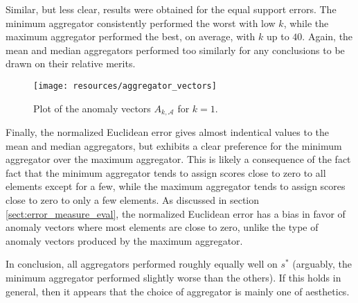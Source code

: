 Similar, but less clear, results were obtained for the equal support errors. The minimum aggregator consistently performed the worst with low $k$, while the maximum aggregator performed the best, on average, with $k$ up to $40$. Again, the mean and median aggregators performed too similarly for any conclusions to be drawn on their relative merits.

\begin{wrapfigure}{r}{0.49\textwidth}
    \vspace{-20pt}
    \begin{center}
        \texttt{[image: resources/aggregator\_vectors]}
    \end{center}
    \vspace{-20pt}
    \caption{\small{Plot of the anomaly vectors $A_{k, \mathcal{A}}$ for $k=1$.}}
    \vspace{-0pt}
    \label{fig:aggregator_vectors}
\end{wrapfigure}

Finally, the normalized Euclidean error gives almost indentical values to the mean and median aggregators, but exhibits a clear preference for the minimum aggregator over the maximum aggregator. This is likely a consequence of the fact fact that the minimum aggregator tends to assign scores close to zero to all elements except for a few, while the maximum aggregator tends to assign scores close to zero to only a few elements. As discussed in section \ref{sect:error_measure_eval}, the normalized Euclidean error has a bias in favor of anomaly vectors where most elements are close to zero, unlike the type of anomaly vectors produced by the maximum aggregator. 

In conclusion, all aggregators performed roughly equally well on $s^*$ (arguably, the minimum aggregator performed slightly worse than the others). If this holds in general, then it appears that the choice of aggregator is mainly one of aesthetics.

